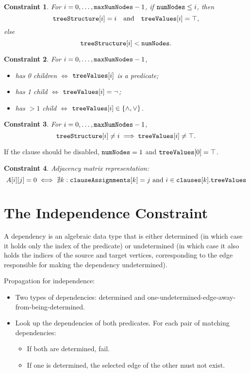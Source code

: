 \documentclass{article}
\newtheorem{constraint}{Constraint}
\theoremstyle{definition}
\newcommand{\variable}[1]{\texttt{\textup{#1}}}
\begin{document}
\begin{constraint}
  For $i = 0, \dots, \variable{maxNumNodes} - 1$, if $\variable{numNodes} \le
  i$, then
  \[
    \variable{treeStructure}[i] = i \quad \text{and} \quad
    \variable{treeValues}[i] = \top,
  \]
  else
  \[
    \variable{treeStructure}[i] < \variable{numNodes}.
  \]
\end{constraint}

\begin{constraint}
  For $i = 0, \dots, \variable{maxNumNodes} - 1$,
  \begin{itemize}
  \item has 0 children $\iff$ $\variable{treeValues}[i]$ is a predicate;
  \item has 1 child $\iff$ $\variable{treeValues}[i] = \neg$;
  \item has $>1$ child $\iff$ $\variable{treeValues}[i] \in \{ \land, \lor \}$.
  \end{itemize}
\end{constraint}

\begin{constraint}
  For $i = 0, \dots, \variable{maxNumNodes} - 1$,
  \[
    \variable{treeStructure}[i] \ne i \implies \variable{treeValues}[i] \ne
    \top.
  \]
\end{constraint}

If the clause should be disabled, $\variable{numNodes} = 1$ and
$\variable{treeValues}[0] = \top$.

\begin{constraint}
  Adjacency matrix representation:
  \[
    A[i][j] = 0 \iff \nexists k: \variable{clauseAssignments}[k] = j \text{ and }
    i \in \variable{clauses}[k].\variable{treeValues}
  \]
\end{constraint}

\section{The Independence Constraint}

A dependency is an algebraic data type that is either determined (in which case
it holds only the index of the predicate) or undetermined (in which case it also
holds the indices of the source and target vertices, corresponding to the edge
responsible for making the dependency undetermined).

Propagation for independence:
\begin{itemize}
\item Two types of dependencies: determined and
  one-undetermined-edge-away-from-being-determined.
\item Look up the dependencies of both predicates. For each pair of
  matching dependencies:
  \begin{itemize}
  \item If both are determined, fail.
  \item If one is determined, the selected edge of the other must not
    exist.
  \end{itemize}
\end{itemize}
\end{document}
